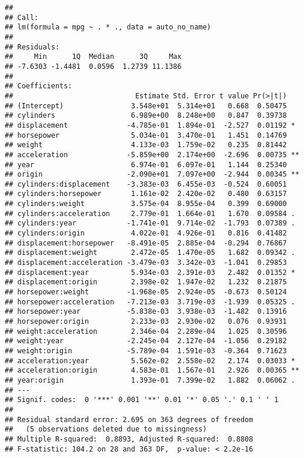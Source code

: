 \documentclass[
]{article}
\begin{document}
\begin{verbatim}
## 
## Call:
## lm(formula = mpg ~ . * ., data = auto_no_name)
## 
## Residuals:
##     Min      1Q  Median      3Q     Max 
## -7.6303 -1.4481  0.0596  1.2739 11.1386 
## 
## Coefficients:
##                             Estimate Std. Error t value Pr(>|t|)   
## (Intercept)                3.548e+01  5.314e+01   0.668  0.50475   
## cylinders                  6.989e+00  8.248e+00   0.847  0.39738   
## displacement              -4.785e-01  1.894e-01  -2.527  0.01192 * 
## horsepower                 5.034e-01  3.470e-01   1.451  0.14769   
## weight                     4.133e-03  1.759e-02   0.235  0.81442   
## acceleration              -5.859e+00  2.174e+00  -2.696  0.00735 **
## year                       6.974e-01  6.097e-01   1.144  0.25340   
## origin                    -2.090e+01  7.097e+00  -2.944  0.00345 **
## cylinders:displacement    -3.383e-03  6.455e-03  -0.524  0.60051   
## cylinders:horsepower       1.161e-02  2.420e-02   0.480  0.63157   
## cylinders:weight           3.575e-04  8.955e-04   0.399  0.69000   
## cylinders:acceleration     2.779e-01  1.664e-01   1.670  0.09584 . 
## cylinders:year            -1.741e-01  9.714e-02  -1.793  0.07389 . 
## cylinders:origin           4.022e-01  4.926e-01   0.816  0.41482   
## displacement:horsepower   -8.491e-05  2.885e-04  -0.294  0.76867   
## displacement:weight        2.472e-05  1.470e-05   1.682  0.09342 . 
## displacement:acceleration -3.479e-03  3.342e-03  -1.041  0.29853   
## displacement:year          5.934e-03  2.391e-03   2.482  0.01352 * 
## displacement:origin        2.398e-02  1.947e-02   1.232  0.21875   
## horsepower:weight         -1.968e-05  2.924e-05  -0.673  0.50124   
## horsepower:acceleration   -7.213e-03  3.719e-03  -1.939  0.05325 . 
## horsepower:year           -5.838e-03  3.938e-03  -1.482  0.13916   
## horsepower:origin          2.233e-03  2.930e-02   0.076  0.93931   
## weight:acceleration        2.346e-04  2.289e-04   1.025  0.30596   
## weight:year               -2.245e-04  2.127e-04  -1.056  0.29182   
## weight:origin             -5.789e-04  1.591e-03  -0.364  0.71623   
## acceleration:year          5.562e-02  2.558e-02   2.174  0.03033 * 
## acceleration:origin        4.583e-01  1.567e-01   2.926  0.00365 **
## year:origin                1.393e-01  7.399e-02   1.882  0.06062 . 
## ---
## Signif. codes:  0 '***' 0.001 '**' 0.01 '*' 0.05 '.' 0.1 ' ' 1
## 
## Residual standard error: 2.695 on 363 degrees of freedom
##   (5 observations deleted due to missingness)
## Multiple R-squared:  0.8893, Adjusted R-squared:  0.8808 
## F-statistic: 104.2 on 28 and 363 DF,  p-value: < 2.2e-16
\end{verbatim}
\end{document}
